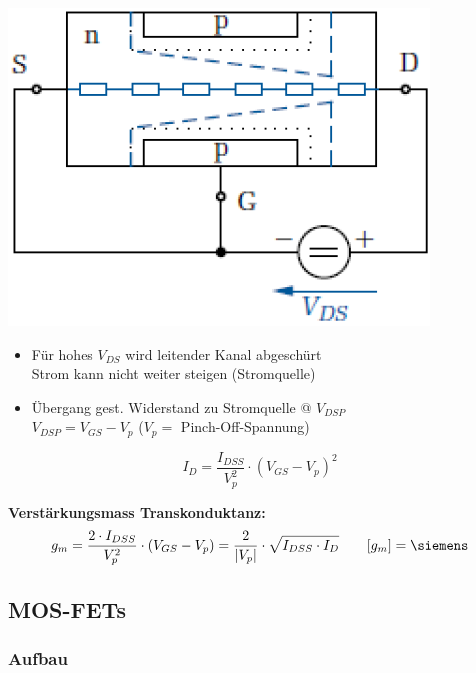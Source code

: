     \begin{minipage}[t]{0.3\columnwidth}
        \includegraphics[align=t, width=\columnwidth]{images/fet_aufbau_saettigung.png}
    \end{minipage}
    \hfill
    \begin{minipage}[t]{0.68\columnwidth}
        \begin{itemize}
            \item Für hohes $V_{DS}$ wird leitender Kanal abgeschürt \\
                \textrightarrow Strom kann nicht weiter steigen (Stromquelle)
            \item Übergang gest. Widerstand zu Stromquelle @ $V_{DSP}$ \\
            \textrightarrow $V_{DSP} = V_{GS} - V_p$ ($V_p =$ Pinch-Off-Spannung)   %
        \end{itemize}

        $$ I_D = \frac{ I_{DSS}}{V_p^2} \cdot ( V_{GS} - V_p )^2 $$
    \end{minipage}

    \textbf{Verstärkungsmass Transkonduktanz:}
    $$ g_m = \frac{ 2 \cdot I_{DSS}}{V_p^2} \cdot ( V_{GS} - V_p ) = \frac{2}{| V_p |} \cdot \sqrt{I_{DSS} \cdot I_D} \qquad [g_m] = \siemens $$


\subsection{MOS-FETs}

\subsubsection{Aufbau}


